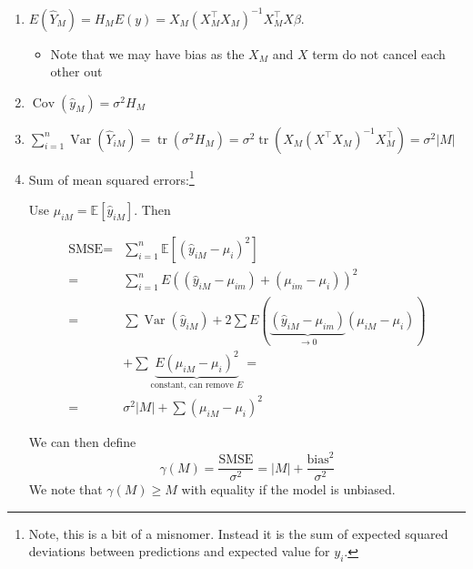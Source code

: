\documentclass[11pt, %
	oneside, %
	english, %
	onehalfspacing, %
	]{article} %
\numberwithin{equation}{section}
\begin{document}
\begin{enumerate}
	\item $E\left(\hat{Y}_M\right)=H_M E(y)=X_M\left(X_M^{\top} X_M\right)^{-1} X_M^{\top} X \beta$.
	\begin{itemize}
        \item Note that we may have bias as the $X_M$ and $X$ term do not cancel each other out
    \end{itemize}
	\item $\operatorname{Cov}\left(\hat{y}_M\right)=\sigma^2 H_M$
	\item $\sum_{i=1}^n \operatorname{Var}\left(\hat{Y}_{i M}\right)=\operatorname{tr}\left(\sigma^2 H_M\right)=\sigma^2 \operatorname{tr}\left(X_M\left(X^{\top} X_M\right)^{-1} X_M^{\top}\right)= \sigma^2 \left| M \right|$
	\item Sum of mean squared errors:\footnote{Note, this is a bit of a misnomer. Instead it is the sum of expected squared deviations between predictions and expected value for $y_i$.}

        Use $\mu_{iM} = \mathbb{E} \left[ \hat{y}_{iM}\right]$. Then

        \begin{equation}\label{eq:smse_rel}
            \begin{aligned}
                \text{SMSE}= & \sum_{i=1}^n \mathbb{E}\left[\left(\hat{y}_{i M}-\mu_i\right)^2\right] \\
                = & \sum_{i=1}^n E\left(\left(\hat{y}_{i M}-\mu_{i m}\right)+\left(\mu_{i m}-\mu_i\right)\right)^2 \\
                = & \sum \operatorname{Var}\left(\hat{y}_{i M}\right)+2 \sum E(\underbrace{\left(\hat{y}_{i M}-\mu_{i m}\right)}_{\rightarrow 0}\left(\mu_{i M}-\mu_i\right)) \\
                & +\sum \underbrace{ E\left(\mu_{i M}-\mu_i\right)^2 }_{ \text{constant, can remove }E }= \\
                = & \sigma^2|M|+\sum \left(\mu_{i M}-\mu_i\right)^2
                \end{aligned}
        \end{equation}

        We can then define
        \begin{equation}\label{gamma_cp}
            \gamma(M) = \frac{\text{SMSE}}{\sigma^2} = \left| M \right| + \frac{\text{bias}^2}{\sigma^2}
        \end{equation}
        We note that $\gamma(M) \geq M$ with equality if the model is unbiased.


\end{enumerate}
\end{document}
